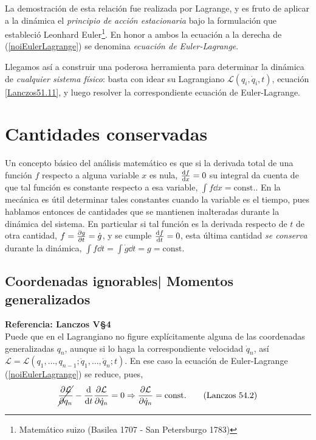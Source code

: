 \documentclass[12pt, spanish, a4paper, ]{article}
\begin{document}
La demostración de esta relación fue realizada por Lagrange, y es fruto de aplicar a la dinámica el \emph{principio de acción estacionaria} bajo la formulación que estableció Leonhard Euler\footnote{Matemático suizo (Basilea 1707 - San Petersburgo 1783)}. 
En honor a ambos la ecuación a la derecha de (\ref{noiEulerLagrange}) se denomina \emph{ecuación de Euler-Lagrange}.

Llegamos así a construir una poderosa herramienta para determinar la dinámica de \emph{cualquier sistema físico}:
basta con idear su Lagrangiano \(\mathcal{L}(q_i, \dot{q}_i, t)\), ecuación \eqref{Lanczos51.11}, y luego resolver la correspondiente ecuación de Euler-Lagrange.


\section{Cantidades conservadas}
Un concepto básico del análisis matemático es que si la derivada total de una función \(f\) respecto a alguna variable \(x\) es nula, \(\dv{f}{x}=0\) su integral da cuenta de que tal función es constante respecto a esa variable, \(\int f \dd x= \mathrm{const.}\).
En la mecánica es útil determinar tales constantes cuando la variable es el tiempo, pues hablamos entonces de cantidades que se mantienen inalteradas durante la dinámica del sistema.
En particular si tal función es la derivada respecto de \(t\) de otra cantidad, \(f= \pdv{g}{t}= \dot{g}\), y se cumple \(\dv{f}{t}=0\), esta última cantidad \emph{se conserva} durante la dinámica, \(\int f \dd t= \int \dot{g} \dd t= g= \mathrm{const.}\) 


\subsection{Coordenadas ignorables| Momentos generalizados} %
\textbf{Referencia: Lanczos V\S4}\\

Puede que en el Lagrangiano no figure explícitamente alguna de las coordenadas generalizadas \(q_n\), aunque si lo haga la correspondiente velocidad \(\dot{q}_n\), así \(\mathcal{L} = \mathcal{L}(q_1,\ldots,q_{n - 1};\dot{q}_1,\ldots,\dot{q}_n;t)\).
En ese caso la ecuación de Euler-Lagrange (\ref{noiEulerLagrange}) se reduce, pues, 
\begin{equation}\label{unsereLanczos54.2}
    \cancel{\pdv{\mathcal{L}}{q_n}} - \dv{t} \pdv{\mathcal{L}}{\dot{q}_n}= 0 \Rightarrow \pdv{\mathcal{L}}{\dot{q}_n}= \mathrm{const.}
    \tag{Lanczos 54.2}
\end{equation}
\end{document}
